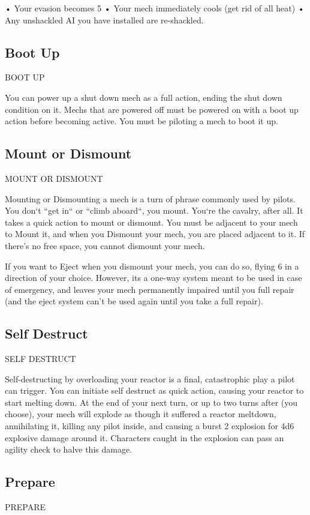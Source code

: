        •  Your evasion becomes 5
       •  Your mech immediately cools (get rid of all heat)
       • Any unshackled AI you have installed are re-shackled.
\subsection{Boot Up}
                                              BOOT UP

You can power up a shut down mech as a full action, ending the shut down condition on it.
Mechs that are powered off must be powered on with a boot up action before becoming active.
You must be piloting a mech to boot it up.




\subsection{Mount or Dismount}
                                     MOUNT OR DISMOUNT

Mounting or Dismounting a mech is a turn of phrase commonly used by pilots. You don‘t “get
in“ or “climb aboard“, you mount. You‘re the cavalry, after all. It takes a quick action to mount or
dismount. You must be adjacent to your mech to Mount it, and when you Dismount your mech,
you are placed adjacent to it. If there’s no free space, you cannot dismount your mech.


If you want to Eject when you dismount your mech, you can do so, flying 6 in a direction of your
choice. However, its a one-way system meant to be used in case of emergency, and leaves your
mech permanently impaired until you full repair (and the eject system can’t be used again until
you take a full repair).

\subsection{Self Destruct}
                                          SELF DESTRUCT

Self-destructing by overloading your reactor is a final, catastrophic play a pilot can trigger. You
can initiate self destruct as quick action, causing your reactor to start melting down. At the end
of your next turn, or up to two turns after (you choose), your mech will explode as though it
suffered a reactor meltdown, annihilating it, killing any pilot inside, and causing a burst 2
explosion for 4d6 explosive damage around it. Characters caught in the explosion can pass an
agility check to halve this damage.
\subsection{Prepare}
                                                PREPARE

